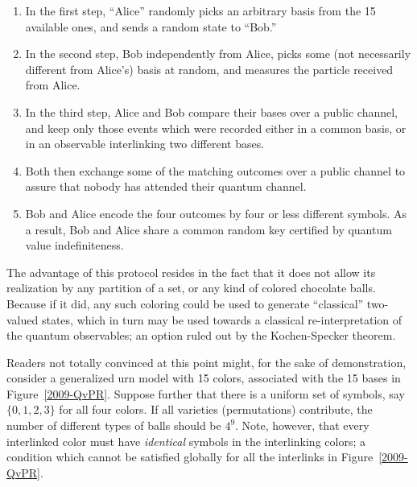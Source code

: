 \documentclass[%
 preprint,
 showpacs,
 showkeys,
 preprintnumbers,
 amsmath,amssymb,
 aps,
 pra,
  longbibliography,
 ]{revtex4-1}
\begin{document}
\begin{enumerate}
\item
In the first step, ``Alice'' randomly picks an arbitrary basis from the 15 available ones,
and sends a random state to ``Bob.''
\item
In the second step, Bob independently from Alice, picks some (not necessarily different from Alice's) basis at random,
and measures the particle received from Alice.
\item
In the third step, Alice and Bob compare their bases over a public channel,
and keep only those events which were recorded either in a common basis,
or in an observable interlinking two different bases.
\item
Both then exchange some of the matching outcomes  over a public channel to assure that nobody
has attended their quantum channel.
\item
Bob and Alice encode the four outcomes by four or less different symbols.
As a result, Bob and Alice share a common random key certified by quantum value indefiniteness.
\end{enumerate}


The advantage of this protocol resides in the fact that it does not allow its realization by
any partition of a set, or any kind of colored chocolate balls.
Because if it did, any such coloring could be used to generate ``classical'' two-valued states,
which in turn may be used towards a classical re-interpretation of the quantum observables; an option
ruled out by the Kochen-Specker theorem.

Readers  not  totally convinced at this point might, for the sake of demonstration,
consider a generalized urn model with 15 colors, associated with the 15 bases
in Figure~\ref{2009-QvPR}.
Suppose further that there is a uniform set of symbols, say $\{0,1,2,3\}$
for all four colors.
If all varieties (permutations) contribute, the number of different types of balls
should be $4^9$. Note, however, that every interlinked color must have {\em identical}
symbols in the interlinking colors; a condition which cannot be satisfied
globally for all the interlinks in Figure~\ref{2009-QvPR}.
\end{document}
